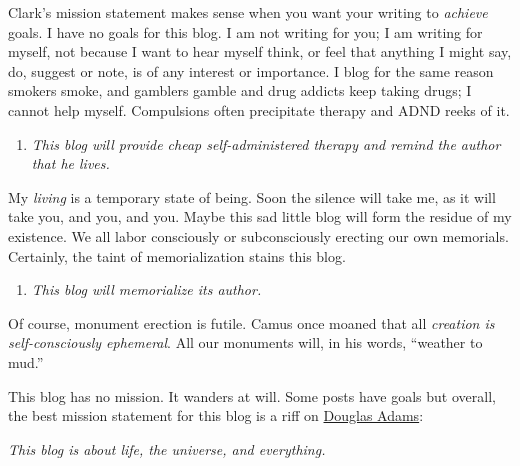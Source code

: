 Clark's mission statement makes sense when you want your writing to
\emph{achieve} goals. I have no goals for this blog. I am not writing
for you; I am writing for myself, not because I want to hear myself
think, or feel that anything I might say, do, suggest or note, is of any
interest or importance. I blog for the same reason smokers smoke, and
gamblers gamble and drug addicts keep taking drugs; I cannot help
myself. Compulsions often precipitate therapy and ADND reeks of it.

\begin{enumerate}
\def\labelenumi{\arabic{enumi}.}
\setcounter{enumi}{5}
\tightlist
\item
  \emph{This blog will provide cheap self-administered therapy and
  remind the author that he lives.}
\end{enumerate}

My \emph{living} is a temporary state of being. Soon the silence will
take me, as it will take you, and you, and you. Maybe this sad little
blog will form the residue of my existence. We all labor consciously or
subconsciously erecting our own memorials. Certainly, the taint of
memorialization stains this blog.

\begin{enumerate}
\def\labelenumi{\arabic{enumi}.}
\setcounter{enumi}{6}
\tightlist
\item
  \emph{This blog will memorialize its author.}
\end{enumerate}

Of course, monument erection is futile. Camus once moaned that all
\emph{creation is self-consciously ephemeral}. All our monuments will,
in his words, ``weather to mud.''

This blog has no mission. It wanders at will. Some posts have goals but
overall, the best mission statement for this blog is a riff on
\href{https://en.wikipedia.org/wiki/Douglas_Adams}{Douglas Adams}:

\emph{This blog is about life, the universe, and everything.}

%


%
 


